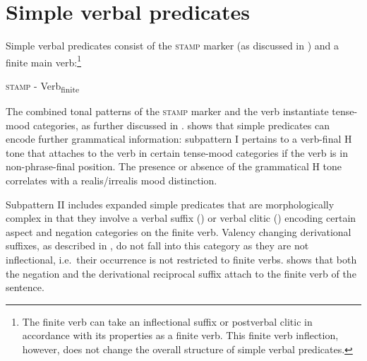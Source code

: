 \section{Simple verbal predicates}
\label{sec:SimpPred}

Simple verbal predicates consist of the \textsc{stamp} marker (as discussed in ) and a finite main verb:\footnote{The finite verb can take an inflectional suffix or postverbal clitic in accordance with its properties as a finite verb. This finite verb inflection, however, does not change the overall structure of simple verbal predicates.}

\begin{center}
\textsc{stamp} - Verb\textsubscript{finite}
\end{center}

\noindent The combined tonal patterns of the \textsc{stamp} marker and the verb instantiate tense-mood categories, as further discussed in .  shows that simple predicates can encode further grammatical information: subpattern I pertains to a verb-final H tone that attaches to the verb in certain tense-mood categories if the verb is in non-phrase-final position. The presence or absence of the grammatical H tone correlates with a realis/irrealis mood distinction.



\noindent Subpattern II includes expanded simple predicates that are morphologically complex in that they involve a verbal suffix () or verbal clitic () encoding certain aspect and negation categories on the finite verb. 
Valency changing derivational suffixes, as described in , do not fall into this category as they are not inflectional, i.e.\ their occurrence is not restricted to finite verbs.  shows that both the negation and the derivational reciprocal suffix attach to the finite verb of the sentence.

